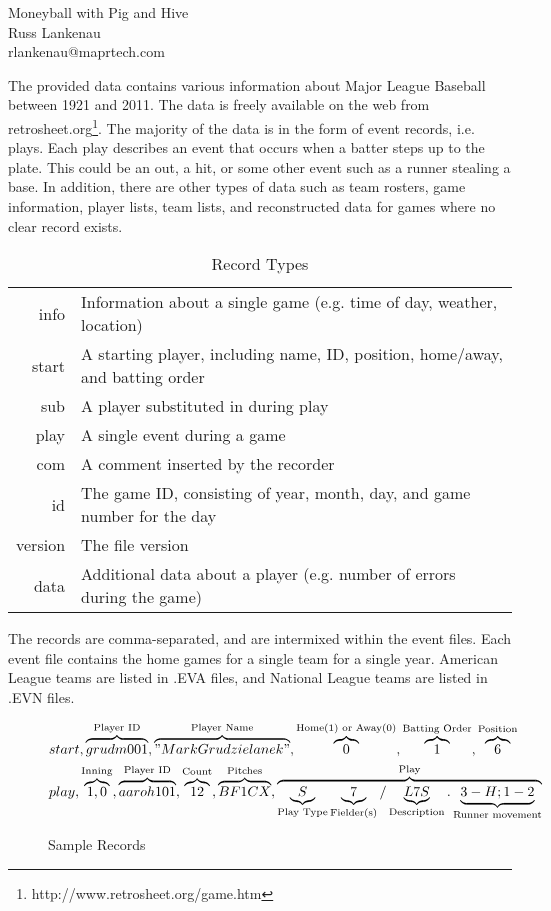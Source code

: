 \documentclass[10pt,letterpaper]{article}
\begin{document}
\raggedbottom
\begin{center}
Moneyball with Pig and Hive \\
Russ Lankenau \\ 
rlankenau@maprtech.com
\end{center}

The provided data contains various information about Major League Baseball between 1921 and 2011.  The data is freely available on the web from retrosheet.org\footnote{http://www.retrosheet.org/game.htm}.  The majority of the data is in the form of event records, i.e. plays.  Each play describes an event that occurs when a batter steps up to the plate.  This could be an out, a hit, or some other event such as a runner stealing a base.  In addition, there are other types of data such as team rosters, game information, player lists, team lists, and reconstructed data for games where no clear record exists.

\begin{table}[h]
\begin{tabular}{rl}
info & Information about a single game (e.g. time of day, weather, location)\\
start & A starting player, including name, ID, position, home/away, and batting order\\
sub & A player substituted in during play\\
play & A single event during a game\\
com & A comment inserted by the recorder\\
id & The game ID, consisting of year, month, day, and game number for the day\\
version & The file version\\
data & Additional data about a player (e.g. number of errors during the game)\\ 
\end{tabular}
\caption{Record Types}
\end{table}

The records are comma-separated, and are intermixed within the event files.  Each event file contains the home games for a single team for a single year. American League teams are listed in .EVA files, and National League teams are listed in .EVN files.    

\begin{figure}[h]
\begin{align}
&start,\overbrace{grudm001}^\text{Player ID},\overbrace{"Mark Grudzielanek"}^\text{Player Name},\overbrace{0}^\text{Home(1) or Away(0)},\overbrace{1}^\text{Batting Order},\overbrace{6}^\text{Position} \nonumber \\
&play,\overbrace{1,0}^\text{Inning},\overbrace{aaroh101}^\text{Player ID},\overbrace{12}^\text{Count},\overbrace{BF1CX}^\text{Pitches},\overbrace{\underbrace{S}_\text{Play Type}\underbrace{7}_\text{Fielder(s)}/\underbrace{L7S}_\text{Description}.\underbrace{3-H;1-2}_\text{Runner movement}}^\text{Play} \nonumber
\end{align}
\caption{Sample Records}
\end{figure}
\end{document}
